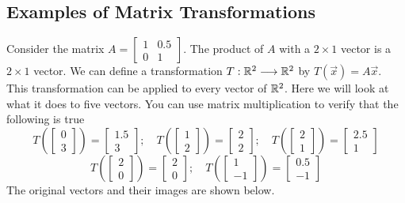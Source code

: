 \documentclass{ximera}
\begin{document}
\subsection*{Examples of Matrix Transformations}
Consider the matrix $A=\begin{bmatrix}1&0.5\\0&1\end{bmatrix}$.  The product of $A$ with a $2\times 1$ vector is a $2\times 1$ vector.  We can define a transformation $T:\mathbb{R}^2\longrightarrow\mathbb{R}^2$ by $T(\vec{x})=A\vec{x}$.  This transformation can be applied to every vector of $\mathbb{R}^2$.  Here we will look at what it does to five vectors.  You can use matrix multiplication to verify that the following is true
$$T\left(\begin{bmatrix}0\\3\end{bmatrix}\right)=\begin{bmatrix}1.5\\3\end{bmatrix};\quad T\left(\begin{bmatrix}1\\2\end{bmatrix}\right)=\begin{bmatrix}2\\2\end{bmatrix};\quad T\left(\begin{bmatrix}2\\1\end{bmatrix}\right)=\begin{bmatrix}2.5\\1\end{bmatrix}$$
$$T\left(\begin{bmatrix}2\\0\end{bmatrix}\right)=\begin{bmatrix}2\\0\end{bmatrix};\quad T\left(\begin{bmatrix}1\\-1\end{bmatrix}\right)=\begin{bmatrix}0.5\\-1\end{bmatrix}$$
The original vectors and their images are shown below.
\end{document}

